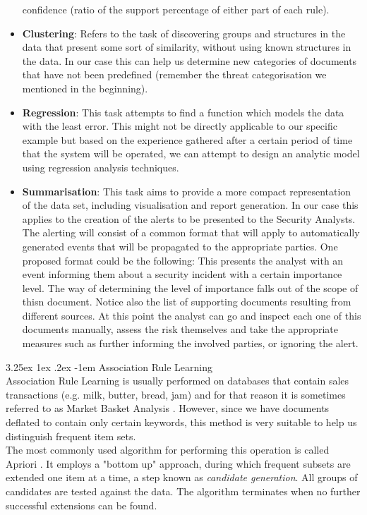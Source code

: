 \documentclass[12pt]{article}
\makeatletter
\newcounter{subsubsubsection}[subsubsection]
\renewcommand\paragraph{\@startsection{paragraph}{5}{\z@}%
  {3.25ex \@plus1ex \@minus.2ex}%
  {-1em}%
  {\normalfont\normalsize\bfseries}}
\makeatother
\begin{document}
\begin{itemize}
confidence (ratio of the support percentage of either part of each rule).
\item 
\textbf{Clustering}: Refers to the task of discovering groups and structures in the data that present
some sort of similarity, without using known structures in the data. In our case this can help us
determine new categories of documents that have not been predefined (remember the threat
categorisation we mentioned in the beginning).
\item
\textbf{Regression}: This task attempts to find a function which models the data with the least error.
This might not be directly applicable to our specific example but based on the experience
gathered after a certain period of time that the system will be operated, we can attempt to
design an analytic model using regression analysis techniques.
\item
\textbf{Summarisation}: This task aims to provide a more compact representation of the data set, including visualisation and report generation. In our case this applies to the creation of the alerts to be presented to the Security Analysts. The alerting will consist of a common format that will apply to automatically generated events that will be propagated to the appropriate parties. One proposed format could be the following:
This presents the analyst with an event informing them about a security incident with a certain importance level. The way of determining the level of importance falls out of the scope of thisn document. Notice also the list of supporting documents resulting from different sources. At this point the analyst can go and inspect each one of this documents manually, assess the risk themselves and take the appropriate measures such as further informing the involved parties, or ignoring the alert.
\end{itemize}
\paragraph{Association Rule Learning}
\hfill \break 
\\
Association Rule Learning is usually performed on databases that contain sales transactions (e.g. {milk, butter, bread, jam}) and for that reason it is sometimes referred to as Market Basket Analysis \cite{assoc1}. However, since we have documents deflated to contain only certain keywords, this method is very suitable to help us distinguish frequent item sets. 
\hfill \break 
\\
The most commonly used algorithm for performing this operation is called Apriori \cite{apriori1}. It  employs a "bottom up" approach, during which frequent subsets are extended one item at a time, a step known as \textit{candidate generation}. All groups of candidates are tested against the data. The algorithm terminates when no further successful extensions can be found.
\hfill \break 
\\
\end{document}
